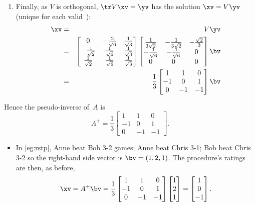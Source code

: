 \begin{example}
\begin{solution}
\begin{enumerate}
\item Finally, as \(V\) is orthogonal, \(\tr V\xv=\yv\) has the solution \(\xv=V\yv\) (unique for each valid~\yv):
\begin{eqnarray*}
\xv&=&V\yv
\\&=&\begin{bmatrix} 0&-\frac2{\sqrt6}&\frac1{\sqrt3}
\\-\frac1{\sqrt2}&\frac1{\sqrt6}&\frac1{\sqrt3}
\\\frac1{\sqrt2}&\frac1{\sqrt6}&\frac1{\sqrt3} \end{bmatrix}
\begin{bmatrix} \frac1{3\sqrt2}&-\frac1{3\sqrt2}&-\frac{\sqrt2}3 
\\-\frac1{\sqrt6}&-\frac1{\sqrt6}&0
\\0&0&0 \end{bmatrix}\bv
\\&=&\frac13\begin{bmatrix} 1&1&0
\\-1&0&1
\\0& -1&-1 \end{bmatrix}\bv
\end{eqnarray*}
\end{enumerate}
Hence the pseudo-inverse of~\(A\) is
\begin{equation*}
A^+=\frac13\begin{bmatrix} 1&1&0
\\-1&0&1
\\0& -1&-1 \end{bmatrix}.
\end{equation*}
\begin{itemize}
\item In \cref{eg:rstp}, Anne beat Bob
3-2 games; Anne beat Chris 3-1; Bob beat Chris 3-2 so the right-hand side vector is \(\bv=(1,2,1)\).
The procedure's ratings are then, as before, 
\begin{equation*}
\xv=A^+\bv=\frac13\begin{bmatrix} 1&1&0
\\-1&0&1
\\0& -1&-1 \end{bmatrix}\begin{bmatrix} 1\\2\\1 \end{bmatrix}
=\begin{bmatrix} 1\\0\\-1 \end{bmatrix}.
\end{equation*}


\end{itemize}
\end{solution}
\end{example}
